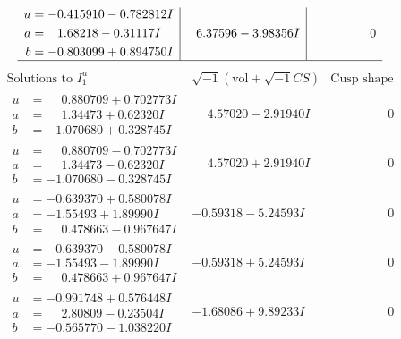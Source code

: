 \documentclass[1p]{elsarticle_modified}
\theoremstyle{definition}
\newcommand{\I}{\sqrt{-1}}
\begin{document}
$$\begin{array}{c|c|c}
\begin{aligned}
u &= -0.415910 - 0.782812 I \\
a &= \phantom{-}1.68218 - 0.31117 I \\
b &= -0.803099 + 0.894750 I\end{aligned}
 & \phantom{-}6.37596 - 3.98356 I & \phantom{-0.000000 } 0\\
 \hline 
 \end{array}$$\newpage$$\begin{array}{c|c|c}  
\text{Solutions to }I^u_{1}& \I (\text{vol} + \sqrt{-1}CS) & \text{Cusp shape}\\
 \hline 
\begin{aligned}
u &= \phantom{-}0.880709 + 0.702773 I \\
a &= \phantom{-}1.34473 + 0.62320 I \\
b &= -1.070680 + 0.328745 I\end{aligned}
 & \phantom{-}4.57020 - 2.91940 I & \phantom{-0.000000 } 0 \\ \hline\begin{aligned}
u &= \phantom{-}0.880709 - 0.702773 I \\
a &= \phantom{-}1.34473 - 0.62320 I \\
b &= -1.070680 - 0.328745 I\end{aligned}
 & \phantom{-}4.57020 + 2.91940 I & \phantom{-0.000000 } 0 \\ \hline\begin{aligned}
u &= -0.639370 + 0.580078 I \\
a &= -1.55493 + 1.89990 I \\
b &= \phantom{-}0.478663 - 0.967647 I\end{aligned}
 & -0.59318 - 5.24593 I & \phantom{-0.000000 } 0 \\ \hline\begin{aligned}
u &= -0.639370 - 0.580078 I \\
a &= -1.55493 - 1.89990 I \\
b &= \phantom{-}0.478663 + 0.967647 I\end{aligned}
 & -0.59318 + 5.24593 I & \phantom{-0.000000 } 0 \\ \hline\begin{aligned}
u &= -0.991748 + 0.576448 I \\
a &= \phantom{-}2.80809 - 0.23504 I \\
b &= -0.565770 - 1.038220 I\end{aligned}
 & -1.68086 + 9.89233 I & \phantom{-0.000000 } 0 \\ \hline\begin{aligned}

\end{aligned}
\end{array}$$
\end{document}

